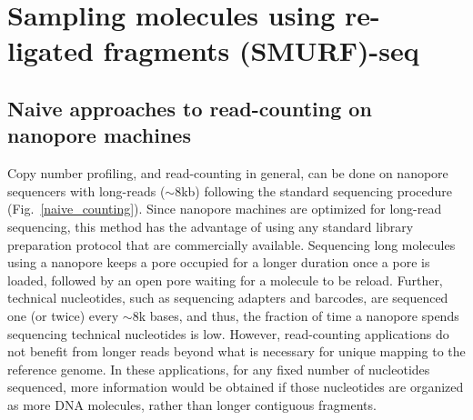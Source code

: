 \chapter{Sampling molecules using re-ligated fragments (SMURF)-seq}
\label{ch3}


\section{Naive approaches to read-counting on nanopore machines}
Copy number profiling, and read-counting in general, can be done on
nanopore sequencers with long-reads ($\sim$8kb) following the standard
sequencing procedure (Fig.~\ref{naive_counting}).
Since nanopore machines are optimized for long-read sequencing, this
method has the advantage of using any standard library preparation
protocol that are commercially available.  Sequencing long
molecules using a nanopore keeps a pore occupied for a longer duration
once a pore is loaded, followed by an open pore waiting for a molecule to
be reload.  Further, technical nucleotides, such as sequencing adapters
and barcodes, are sequenced one (or twice) every $\sim$8k bases, and
thus, the fraction of time a nanopore spends sequencing technical
nucleotides is low.
However, read-counting applications do not benefit from longer reads
beyond what is necessary for unique mapping to the reference genome. In
these applications, for any fixed number of nucleotides sequenced, more
information would be obtained if those nucleotides are organized as more
DNA molecules, rather than longer contiguous fragments.

